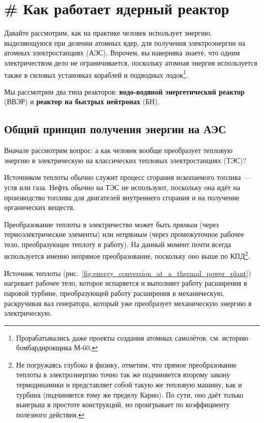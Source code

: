 \clearpage

\section{\# Как работает ядерный реактор}

Давайте рассмотрим, как на практике человек использует энергию, выделяющуюся при делении атомных ядер, для получения электроэнергии на атомных электростанциях (АЭС). Впрочем, вы наверняка знаете, что одним электричеством дело не ограничивается, поскольку атомная энергия используется также в силовых установках кораблей и подводных лодок\footnote{Прорабатывались даже проекты создания атомных самолётов, см. историю бомбардировщика М-60.}.

Мы рассмотрим два типа реакторов: \textbf{водо-водяной энергетический реактор} (ВВЭР) и \textbf{реактор на быстрых нейтронах} (БН).

\subsection*{Общий принцип получения энергии на АЭС}

Вначале рассмотрим вопрос: а как человек вообще преобразует тепловую энергию в электрическую на классических тепловых электростанциях (ТЭС)?

Источником теплоты обычно служит процесс сгорания ископаемого топлива~--- угля или газа. Нефть обычно на ТЭС не используют, поскольку она идёт на производство топлива для двигателей внутреннего сгорания и на получение органических веществ.

Преобразование теплоты в электричество может быть \emph{прямым} (через термоэлектрические элементы) или \emph{непрямым} (через промежуточное рабочее тело, преобразующее теплоту в работу). На данный момент почти всегда используется именно непрямое преобразование, поскольку оно выше по КПД\footnote{Не погружаясь глубоко в физику, отметим, что прямое преобразование теплоты в электроэнергию точно так же подчиняется второму закону термодинамики и представляет собой такую же тепловую машину, как и турбина (подчиняется тому же пределу Карно). По сути, оно даёт только выигрыш в простоте конструкций, но проигрывает по коэффициенту полезного действия.}.

Источник теплоты (рис.~\ref{fig:energy_conversion_at_a_thermal_power_plant}) нагревает рабочее тело, которое испаряется и выполняет работу расширения в паровой турбине, преобразующей работу расширения в механическую, раскручивая вал генератора, который уже преобразует механическую энергию в электрическую.

